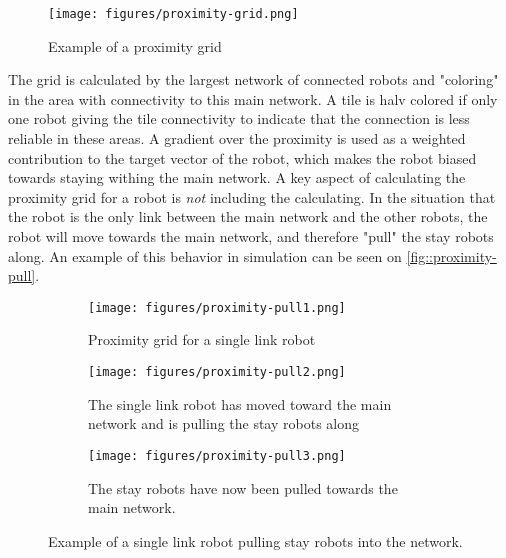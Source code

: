\begin{figure}[h]
    \begin{center}
        \texttt{[image: figures/proximity-grid.png]}
    \end{center}
    \caption{Example of a proximity grid}\label{fig:proximity-grid}
\end{figure}

The grid is calculated by the largest network of connected robots and "coloring" in the area with connectivity to this main network. A tile is halv colored if only one robot giving the tile connectivity to indicate that the connection is less reliable in these areas. A {\color{red} gradient} over the proximity is used as a weighted contribution to the target vector of the robot, which makes the robot biased towards staying withing the main network. A key aspect of calculating the proximity grid for a robot is \emph{not} including the calculating. In the situation that the robot is the only link between the main network and the other robots, the robot will move towards the main network, and therefore "pull" the stay robots along. An example of this behavior in simulation can be seen on \cref{fig::proximity-pull}.

\begin{figure}[h]
    \begin{center}
        \begin{subfigure}[b]{0.31\textwidth}
            \centering
            \texttt{[image: figures/proximity-pull1.png]}
            \caption{Proximity grid for a {\color{red} single link} robot}
            \label{fig:proximity-pull1}
        \end{subfigure}
        \begin{subfigure}[b]{0.31\textwidth}
            \centering
            \texttt{[image: figures/proximity-pull2.png]}
            \caption{The single link robot has moved toward the main network and is pulling the stay robots along}
            \label{fig:proximity-pull2}
        \end{subfigure}
        \begin{subfigure}[b]{0.31\textwidth}
            \centering
            \texttt{[image: figures/proximity-pull3.png]}
            \caption{The stay robots have now been pulled towards the main network.}
            \label{fig:proximity-pull3}
        \end{subfigure}
    \end{center}
    \caption{Example of a {\color{red} single link} robot pulling stay robots into the network.}\label{fig:proximity-pull}
\end{figure}



